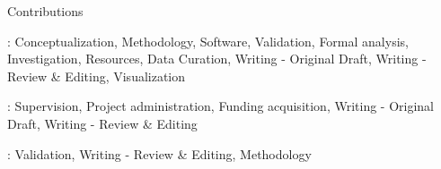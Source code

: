 \documentclass[preprint,3p]{elsarticle}
\begin{document}
{\Large Contributions \par}

\vspace{2cm}

\textbf{\STANLONG}: Conceptualization, Methodology, Software, Validation, Formal analysis, Investigation, Resources, Data Curation, Writing - Original Draft, Writing - Review \& Editing, Visualization

\vspace{1cm}

\textbf{\JULLONG}: Supervision, Project administration, Funding acquisition, Writing - Original Draft, Writing - Review \& Editing

\vspace{1cm}

\textbf{\HIGILONG}: Validation, Writing - Review \& Editing, Methodology
\end{document}
